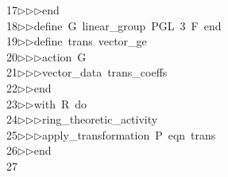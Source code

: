 \begin{tabbing}
17\>$\triangleright$\>$\triangleright$\>$\triangleright$\>end\ \\[0pt]
18\>$\triangleright$\>$\triangleright$\>define\ G\ linear\_group\ PGL\ 3\ F\ end\ \\[0pt]
19\>$\triangleright$\>$\triangleright$\>define\ trans\ vector\_ge\ \\[0pt]
20\>$\triangleright$\>$\triangleright$\>$\triangleright$\>action\ G\ \\[0pt]
21\>$\triangleright$\>$\triangleright$\>$\triangleright$\>vector\_data\ trans\_coeffs\ \\[0pt]
22\>$\triangleright$\>$\triangleright$\>end\ \\[0pt]
23\>$\triangleright$\>$\triangleright$\>with\ R\ do\ \\[0pt]
24\>$\triangleright$\>$\triangleright$\>$\triangleright$\>ring\_theoretic\_activity\ \\[0pt]
25\>$\triangleright$\>$\triangleright$\>$\triangleright$\>apply\_transformation\ P\ eqn\ trans\ \\[0pt]
26\>$\triangleright$\>$\triangleright$\>end\ \\[0pt]
27\>\end{tabbing}
